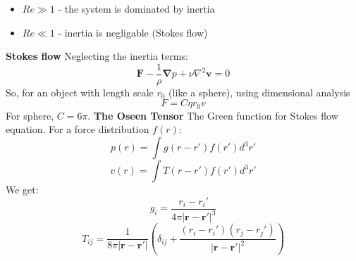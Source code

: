 \documentclass[twocolumn]{article}
\begin{document}
\begin{itemize}
    \item $Re \gg 1$ - the system is dominated by inertia
    \item $Re \ll 1$ - inertia is negligable (Stokes flow)
\end{itemize}
\textbf{Stokes flow}
\newline
Neglecting the inertia terms:
\begin{equation}
    \boldsymbol{F} - \frac{1}{\rho}\boldsymbol{\nabla}p + \nu \nabla^2 \boldsymbol{v} = 0
\end{equation}
So, for an object with length scale $r_0$ (like a sphere), using dimensional analysis
\begin{equation}
    F = C \eta r_0 v
\end{equation}
For sphere, $C = 6\pi$.
\newline
\textbf{The Oseen Tensor}
\newline
The Green function for Stokes flow equation. For a force distribution $f(r)$:
\begin{equation}
    p(r) = \int g(r - r')f(r')d^3r'
\end{equation}
\begin{equation}
    v(r) = \int T(r - r')f(r')d^3r'
\end{equation}
We get:
\begin{equation}
    g_i = \frac{r_i - r_i'}{4\pi|\boldsymbol{r} - \boldsymbol{r}'|^3}
\end{equation}
\begin{equation}
    T_{ij} = \frac{1}{8\pi|\boldsymbol{r} - \boldsymbol{r}'|}\left(\delta_{ij} + \frac{(r_i - r_i')(r_j - r_j')}{|\boldsymbol{r} - \boldsymbol{r}'|^2}\right)
\end{equation}
\end{document}
